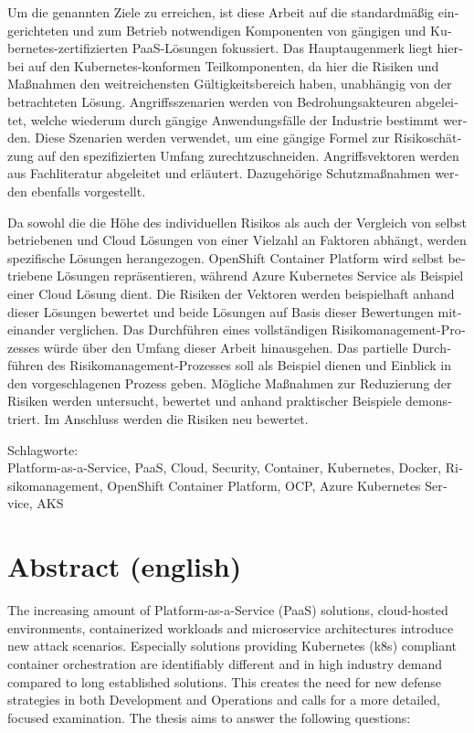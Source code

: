 \begin{otherlanguage}{german}
Um die genannten Ziele zu erreichen, ist diese Arbeit auf die standardmäßig eingerichteten und zum Betrieb notwendigen Komponenten von gängigen und Kubernetes-zertifizierten PaaS-Lösungen fokussiert.
Das Hauptaugenmerk liegt hierbei auf den Kubernetes-konformen Teilkomponenten, da hier die Risiken und Maßnahmen den weitreichensten Gültigkeitsbereich haben, unabhängig von der betrachteten Lösung.
Angriffsszenarien werden von Bedrohungsakteuren abgeleitet, welche wiederum durch gängige Anwendungsfälle der Industrie bestimmt werden.
Diese Szenarien werden verwendet, um eine gängige Formel zur Risikoschätzung auf den spezifizierten Umfang zurechtzuschneiden.
Angriffsvektoren werden aus Fachliteratur abgeleitet und erläutert. Dazugehörige Schutzmaßnahmen werden ebenfalls vorgestellt.

Da sowohl die die Höhe des individuellen Risikos als auch der Vergleich von selbst betriebenen und Cloud Lösungen von einer Vielzahl an Faktoren abhängt, werden spezifische Lösungen herangezogen. OpenShift Container Platform wird selbst betriebene Lösungen repräsentieren, während Azure Kubernetes Service als Beispiel einer Cloud Lösung dient.
Die Risiken der Vektoren werden beispielhaft anhand dieser Lösungen bewertet und beide Lösungen auf Basis dieser Bewertungen miteinander verglichen.
Das Durchführen eines vollständigen Risikomanagement-Prozesses würde über den Umfang dieser Arbeit hinausgehen.
Das partielle Durchführen des Risikomanagement-Prozesses soll als Beispiel dienen und Einblick in den vorgeschlagenen Prozess geben.
Mögliche Maßnahmen zur Reduzierung der Risiken werden untersucht, bewertet und anhand praktischer Beispiele demonstriert.
Im Anschluss werden die Risiken neu bewertet.


\bigskip

\noindent
Schlagworte: \\
Platform-as-a-Service, PaaS, Cloud, Security, Container, Kubernetes, Docker, Risikomanagement, OpenShift Container Platform, OCP, Azure Kubernetes Service, AKS

\end{otherlanguage}

\chapter*{Abstract (english)}
\thispagestyle{empty}

The increasing amount of Platform-as-a-Service (PaaS) solutions, cloud-hosted environments, containerized workloads and microservice architectures introduce new attack scenarios. 
Especially solutions providing Kubernetes (k8s) compliant container orchestration are identifiably different and in high industry demand compared to long established solutions. 
This creates the need for new defense strategies in both Development and Operations and calls for a more detailed, focused examination. 
The thesis aims to answer the following questions:

